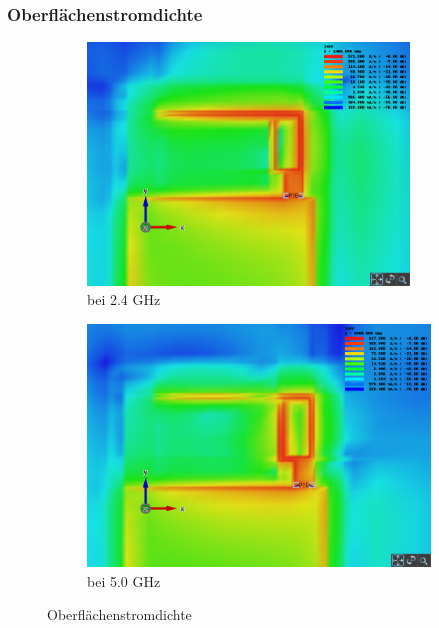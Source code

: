\subsubsection{Oberflächenstromdichte}
\begin{figure}[h!]
	\begin{center}
		\begin{subfigure}[t]{0.49\textwidth}
			\begin{center}
				\includegraphics[width=0.94\textwidth]{../fig/plt/crazy_stuff_l4_pcb_v2c_laptop_1a_105_2ghz4_3d_surface_current_density_xy.png}
				\caption{bei 2.4 GHz}
				\label{fig:currentdensity_2_4}
			\end{center}
		\end{subfigure}
		\begin{subfigure}[t]{0.49\textwidth}
			\begin{center}
				\includegraphics[width=1\textwidth]{../fig/plt/crazy_stuff_l4_pcb_v2c_laptop_1a_105_5ghz_3d_surface_current_density_xy.png}
				\caption{bei 5.0 GHz}
				\label{fig:currentdensity_5_0}
			\end{center}
		\end{subfigure}
		\caption{Oberflächenstromdichte}
		\label{fig:currentdensity}
	\end{center}
\end{figure}

